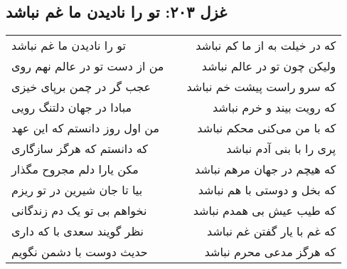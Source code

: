 \begin{center}
\section*{غزل ۲۰۳: تو را نادیدن ما غم نباشد}
\label{sec:203}
\begin{longtable}{l p{0.5cm} r}
تو را نادیدن ما غم نباشد
&&
که در خیلت به از ما کم نباشد
\\
من از دست تو در عالم نهم روی
&&
ولیکن چون تو در عالم نباشد
\\
عجب گر در چمن برپای خیزی
&&
که سرو راست پیشت خم نباشد
\\
مبادا در جهان دلتنگ رویی
&&
که رویت بیند و خرم نباشد
\\
من اول روز دانستم که این عهد
&&
که با من می‌کنی محکم نباشد
\\
که دانستم که هرگز سازگاری
&&
پری را با بنی آدم نباشد
\\
مکن یارا دلم مجروح مگذار
&&
که هیچم در جهان مرهم نباشد
\\
بیا تا جان شیرین در تو ریزم
&&
که بخل و دوستی با هم نباشد
\\
نخواهم بی تو یک دم زندگانی
&&
که طیب عیش بی همدم نباشد
\\
نظر گویند سعدی با که داری
&&
که غم با یار گفتن غم نباشد
\\
حدیث دوست با دشمن نگویم
&&
که هرگز مدعی محرم نباشد
\\
\end{longtable}
\end{center}
